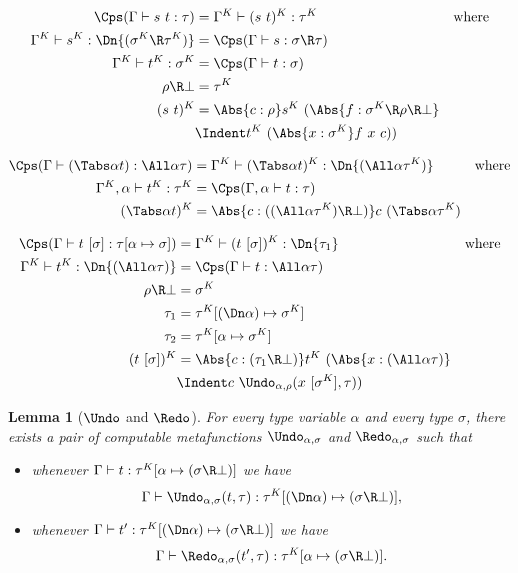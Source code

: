 \documentclass{amsart}
\newtheorem{lemma}[subsection]{Lemma}
\begin{document}
\begin{align*}
\Cps(\Gamma \vdash s~t : \tau) & =
  \Gamma^K \vdash (s~t)^K : \tau^K
  & \mbox{where}
  \\
\Gamma^K \vdash s^K : \Dn{(\sigma^K \R \tau^K)} & =
  \Cps(\Gamma \vdash s : \sigma \R \tau)
  \\
\Gamma^K \vdash t^K : \sigma^K & =
  \Cps(\Gamma \vdash t : \sigma)
  \\
\rho \R \bot & = \tau^K
  \\
(s~t)^K & =
  \Abs{c : \rho} s^K~(\Abs{f : \sigma^K \R \rho \R \bot} \\
  &\Indent t^K~(\Abs{x : \sigma^K} f~x~c))
\end{align*}

\begin{align*}
\Cps(\Gamma \vdash (\Tabs\alpha t) : \All\alpha \tau) & =
  \Gamma^K \vdash (\Tabs\alpha t)^K : \Dn{(\All\alpha \tau^K)}
  & \mbox{where}
  \\
\Gamma^K,\alpha \vdash t^K : \tau^K & =
  \Cps(\Gamma,\alpha \vdash t : \tau)
  \\
(\Tabs\alpha t)^K & =
  \Abs{c : ((\All\alpha \tau^K) \R \bot)}c~(\Tabs\alpha \tau^K)
\end{align*}

\begin{align*}
\Cps(\Gamma \vdash t~[\sigma] : \tau[\alpha\mapsto\sigma]) & =
  \Gamma^K \vdash (t~[\sigma])^K :
  \Dn{\tau_1}
  & \mbox{where}
  \\
\Gamma^K \vdash t^K : \Dn{(\All\alpha \tau)} & =
  \Cps(\Gamma \vdash t : \All\alpha \tau)
  \\
\rho \R \bot & = \sigma^K
  \\
\tau_1 & = \tau^K[(\Dn\alpha) \mapsto \sigma^K]
  \\
\tau_2 & = \tau^K[\alpha \mapsto \sigma^K]
  \\
(t~[\sigma])^K & =
  \Abs{c : (\tau_1 \R \bot)} t^K~(\Abs{x : (\All\alpha\tau)} \\
  &\Indent
  c~\Undo_{\alpha,\rho}(x~[\sigma^K], \tau))
\end{align*}

\begin{lemma}
[$\Undo$ and $\Redo$]
\label{lem:undo-redo}
For every type variable $\alpha$ and every type $\sigma$, there
exists a pair of computable metafunctions $\Undo_{\alpha,\sigma}$
and $\Redo_{\alpha,\sigma}$ such that
\begin{itemize}
\item
whenever
$\Gamma \vdash t : \tau^K[\alpha \mapsto (\sigma\R\bot)]$
we have
\[
\Gamma \vdash \Undo_{\alpha,\sigma}(t,\tau) :
  \tau^K[(\Dn\alpha) \mapsto (\sigma\R\bot)],
\]
\item
whenever
$\Gamma \vdash t' : \tau^K[(\Dn\alpha) \mapsto (\sigma\R\bot)]$
we have
\[
\Gamma \vdash \Redo_{\alpha,\sigma}(t',\tau) :
  \tau^K[\alpha \mapsto (\sigma\R\bot)].
\]
\end{itemize}
\end{lemma}
\end{document}

